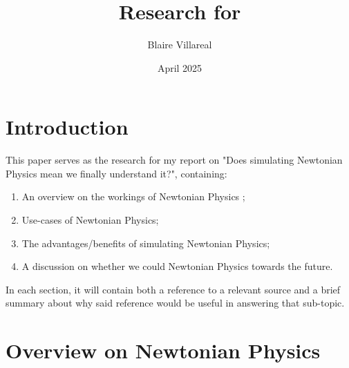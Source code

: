 \documentclass[12pt]{article}
\title{Research for \say{Does simulating Newtonian Physics mean we finally understand it?}}
\author{Blaire Villareal}
\date{April 2025}
\begin{document}
\maketitle

\raggedright %


\section*{Introduction}

This paper serves as the research for my report on "Does simulating Newtonian Physics mean we finally understand it?",
containing: 

\begin{enumerate}
    \item An overview on the workings of Newtonian Physics \parencite{test};
    \item Use-cases of Newtonian Physics;
    \item The advantages/benefits of simulating Newtonian Physics;
    \item A discussion on whether we could  Newtonian Physics towards the future.
\end{enumerate}

\par 

In each section, it will contain both a reference to a relevant source and
a brief summary about why said reference would be useful in answering that sub-topic.

\newpage


\section{Overview on Newtonian Physics}


\end{document}
